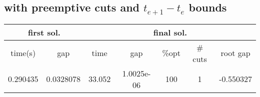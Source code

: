 \documentclass{article}
\begin{document}
\subsection{with preemptive cuts and $t_{e+1}-t_e$ bounds}
\begin{center}
	\begin{tabular}{|cc|ccccc|}
	\hline
     \multicolumn{2}{|c|}{first sol.}& \multicolumn{5}{c|}{final sol.}\\ 
	\hline 
  time(s) & gap & time & gap &\%opt &  \# cuts & root gap\\ 
 \hline 
0.290435 & 0.0328078 & 33.052 & 1.0025e-06 & 100 & 1 & -0.550327\\ 
\hline 
\end{tabular}
\end{center}
\end{document}
